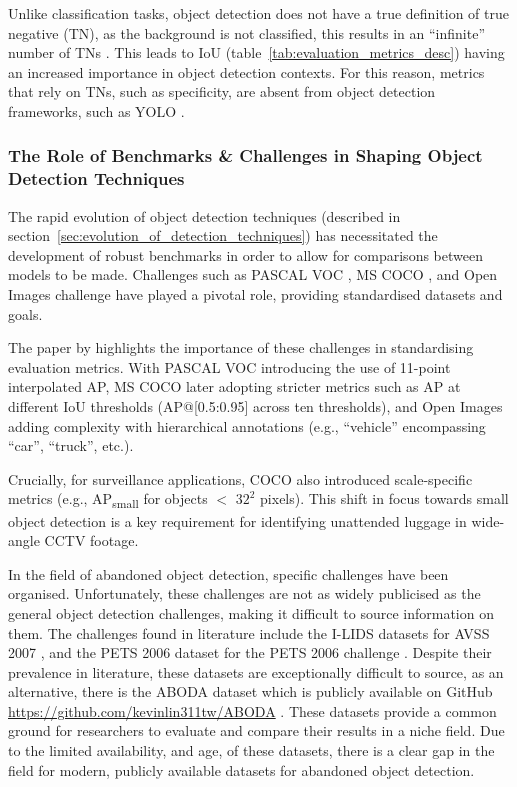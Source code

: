 Unlike classification tasks, object detection does not have a true definition
of true negative (TN), as the background is not classified, this results in an
\enquote{infinite} number of TNs \citep{padilla2020survey}. This leads to IoU
(table~\ref{tab:evaluation_metrics_desc}) having an increased importance in
object detection contexts. For this reason, metrics that rely on TNs, such as
specificity, are absent from object detection frameworks, such as YOLO
\citep{ultralytics2025metrics}.

\subsubsection{The Role of Benchmarks \& Challenges in Shaping Object Detection Techniques}

The rapid evolution of object detection techniques (described in
section~\ref{sec:evolution_of_detection_techniques}) has necessitated the
development of robust benchmarks in order to allow for comparisons between
models to be made. Challenges such as PASCAL VOC \citep{everingham2010pascal},
MS COCO \citep{lin2014microsoft}, and Open Images \citep{krasin2017openimages}
challenge have played a pivotal role, providing standardised datasets and
goals.

The paper by \citet{padilla2020survey} highlights the importance of these
challenges in standardising evaluation metrics. With PASCAL VOC introducing the
use of 11-point interpolated AP, MS COCO later adopting stricter metrics such
as AP at different IoU thresholds (AP@[0.5:0.95] across ten thresholds), and
Open Images adding complexity with hierarchical annotations (e.g.,
\enquote{vehicle} encompassing \enquote{car}, \enquote{truck}, etc.).

Crucially, for surveillance applications, COCO also introduced scale-specific
metrics (e.g., AP\textsubscript{small} for objects $<$ $32^2$ pixels). This
shift in focus towards small object detection is a key requirement for
identifying unattended luggage in wide-angle CCTV footage.

In the field of abandoned object detection, specific challenges have been
organised. Unfortunately, these challenges are not as widely publicised as the
general object detection challenges, making it difficult to source information
on them. The challenges found in literature include the I-LIDS datasets for
AVSS 2007 \citep{qmul2007avss}, and the PETS 2006 dataset for the PETS 2006
challenge \citep{thirde2006pets}. Despite their prevalence in literature, these
datasets are exceptionally difficult to source, as an alternative, there is the
ABODA dataset which is publicly available on GitHub
\url{https://github.com/kevinlin311tw/ABODA} \citep{lin2015aboda}. These
datasets provide a common ground for researchers to evaluate and compare their
results in a niche field. Due to the limited availability, and age, of these
datasets, there is a clear gap in the field for modern, publicly available
datasets for abandoned object detection.

